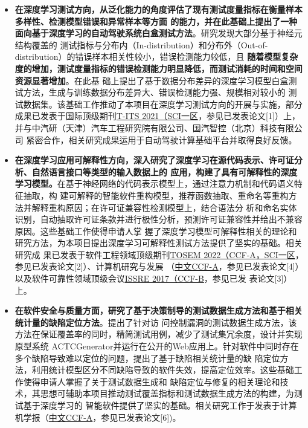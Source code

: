 \documentclass[a4paper,zihao=-4]{article}
\begin{document}
\begin{itemize}
	\item \textbf{在深度学习测试方向，从泛化能力的角度评估了现有测试度量指标在衡量样本多样性、检测模型错误和异常样本等方面
		      的能力，并在此基础上提出了一种面向基于深度学习的自动驾驶系统白盒测试方法}。研究发现大部分基于神经元结构覆盖的
	      测试指标与分布内（In-distribution）和分布外（Out-of-distribution）的错误样本相关性较小，错误检测能力较低，且
	      \textbf{随着模型复杂度的增加，测试度量指标的错误检测能力明显降低，而测试消耗的时间和空间资源显著增加}。在此基
	      础上提出了基于数据分布差异的深度学习模型白盒测试方法，生成与训练数据分布差异大、错误检测能力强、规模相对较小的
	      测试数据集。该基础工作推动了本项目在深度学习测试方向的开展与实施，部分成果已发表于国际顶级期刊\underline{T-ITS
		      2021（SCI一区}，参见已发表论文[1]）上，并与中汽研（天津）汽车工程研究院有限公司、国汽智控（北京）科技有限公司
	      紧密合作，相关研究成果运用于自动驾驶计算基础平台并取得良好反馈。

	\item \textbf{在深度学习应用可解释性方向，深入研究了深度学习在源代码表示、许可证分析、自然语言接口等类型的输入数据上的
		      应用，构建了具有可解释性的深度学习模型。}在基于神经网络的代码表示模型上，通过注意力机制和代码语义特征抽取，构
	      建可解释的智能软件重构模型，推荐函数抽取、重命名等重构方法并解释重构原因；在许可证兼容性检测模型上，结合语法分
	      析和命名实体识别，自动抽取许可证条款并进行极性分析，预测许可证兼容性并给出不兼容原因。这些基础工作使得申请人掌
	      握了深度学习模型可解释性相关的理论和研究方法，为本项目提出深度学习可解释性测试方法提供了坚实的基础。相关研究成
	      果已发表于软件工程领域顶级期刊\underline{TOSEM 2022（CCF-A，SCI一区}，参见已发表论文[2]）、计算机研究与发展
	      （\underline{中文CCF-A}，参见已发表论文[4]）以及软件可靠性领域顶级会议\underline{ISSRE 2017（CCF-B}，参见已发
	      表论文[3]）上。

	\item \textbf{在软件安全与质量方面，研究了基于决策制导的测试数据生成方法和基于相关统计量的缺陷定位方法}。提出了针对访
	      问控制漏洞的测试数据生成方法，该方法在保证覆盖率的同时，精简测试用例，减少了测试集冗余度，设计并实现原型系统
	      ACTCGenerator并运行在公开的Web应用上。针对软件中同时存在多个缺陷导致难以定位的问题，提出了基于缺陷相关统计量的缺
	      陷定位方法，利用统计模型区分不同缺陷导致的软件失效，提高定位效率。这些基础工作使得申请人掌握了关于测试数据生成和
	      缺陷定位与修复的相关理论和技术，其思想可辅助本项目推动测试覆盖指标和测试数据生成方法的构建，为测试基于深度学习的
	      智能软件提供了坚实的基础。相关研究工作于发表于计算机学报（\underline{中文CCF-A}，参见已发表论文[6])。
\end{itemize}
\end{document}
